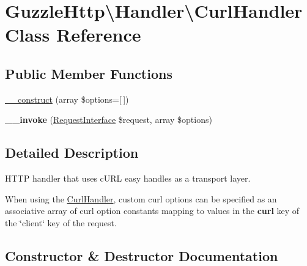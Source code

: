 \hypertarget{classGuzzleHttp_1_1Handler_1_1CurlHandler}{}\section{Guzzle\+Http\textbackslash{}Handler\textbackslash{}Curl\+Handler Class Reference}
\label{classGuzzleHttp_1_1Handler_1_1CurlHandler}
\subsection*{Public Member Functions}
\begin{DoxyCompactItemize}
\item 
\hyperlink{classGuzzleHttp_1_1Handler_1_1CurlHandler_a84f1ea4c2d7fe88a4e91481989f3d972}{\+\_\+\+\_\+construct} (array \$options=\mbox{[}$\,$\mbox{]})
\item 
\mbox{\label{classGuzzleHttp_1_1Handler_1_1CurlHandler_aa884e0108946efe8a3f123c54f9d036f}} 
{\bfseries \+\_\+\+\_\+invoke} (\hyperlink{interfacePsr_1_1Http_1_1Message_1_1RequestInterface}{Request\+Interface} \$request, array \$options)
\end{DoxyCompactItemize}


\subsection{Detailed Description}
H\+T\+TP handler that uses c\+U\+RL easy handles as a transport layer.

When using the \hyperlink{classGuzzleHttp_1_1Handler_1_1CurlHandler}{Curl\+Handler}, custom curl options can be specified as an associative array of curl option constants mapping to values in the {\bfseries curl} key of the \char`\"{}client\char`\"{} key of the request. 

\subsection{Constructor \& Destructor Documentation}
\mbox{\label{classGuzzleHttp_1_1Handler_1_1CurlHandler_a84f1ea4c2d7fe88a4e91481989f3d972}} 
